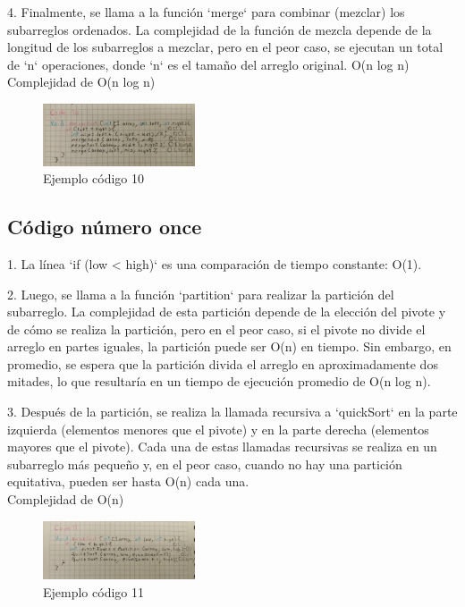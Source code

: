 \documentclass[journal, spanish]{IEEEtran}
\begin{document}
4. Finalmente, se llama a la función `merge` para combinar (mezclar) los subarreglos ordenados. La complejidad de la función de mezcla depende de la longitud de los subarreglos a mezclar, pero en el peor caso, se ejecutan un total de `n` operaciones, donde `n` es el tamaño del arreglo original. O(n log n) \\

Complejidad de O(n log n)
\begin{figure}[H]
  \centering
  \includegraphics[width=0.4\textwidth]{WhatsApp Image 2023-09-11 at 8.02.28 PM.jpeg}
  \caption{Ejemplo código 10}
  \label{fig:imagen1}
\end{figure}

\subsection{Código número once}
1. La línea `if (low < high)` es una comparación de tiempo constante: O(1).

2. Luego, se llama a la función `partition` para realizar la partición del subarreglo. La complejidad de esta partición depende de la elección del pivote y de cómo se realiza la partición, pero en el peor caso, si el pivote no divide el arreglo en partes iguales, la partición puede ser O(n) en tiempo. Sin embargo, en promedio, se espera que la partición divida el arreglo en aproximadamente dos mitades, lo que resultaría en un tiempo de ejecución promedio de O(n log n).

3. Después de la partición, se realiza la llamada recursiva a `quickSort` en la parte izquierda (elementos menores que el pivote) y en la parte derecha (elementos mayores que el pivote). Cada una de estas llamadas recursivas se realiza en un subarreglo más pequeño y, en el peor caso, cuando no hay una partición equitativa, pueden ser hasta O(n) cada una.\\

Complejidad de O(n)


\begin{figure}[H]
  \centering
  \includegraphics[width=0.4\textwidth]{WhatsApp Image 2023-09-11 at 8.02.41 PM.jpeg}
  \caption{Ejemplo código 11}
  \label{fig:imagen1}
\end{figure}
\end{document}
